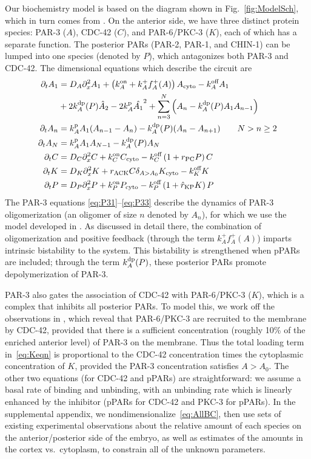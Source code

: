 \documentclass[11pt]{article}
\newcommand{\6}[1]{#1_{\text{6}}}
\newcommand{\3}[1]{#1_{\text{3}}}
\begin{document}
Our biochemistry model is based on the diagram shown in Fig.\ \ref{fig:ModelSch}, which in turn comes from \cite[Fig.~2]{lang2017proteins}. On the anterior side, we have three distinct protein species: PAR-3 ($A$), CDC-42 ($C$), and PAR-6/PKC-3 ($K$), each of which has a separate function. The posterior PARs (PAR-2, PAR-1, and CHIN-1) can be lumped into one species (denoted by $P$), which antagonizes both PAR-3 and CDC-42. The dimensional equations which describe the circuit are 
\begin{subequations}
\label{eq:AllBC}
\begin{align}
\label{eq:P31}
\partial_t A_1 & = D_A \partial_x^2 A_1 + \left(k^\text{on}_A+k^+_A f^+_A(A) \right)A_\text{cyto}- k^\text{off}_A A_1  \\  \nonumber
 &+ 2 k^\text{dp}_A(P) \hat{A}_2-2k^\text{p}_A \hat{A_1}^2+\sum_{n=3}^N \left(A_n-k^\text{dp}_A(P) A_1 A_{n-1}\right)  \\ 
\partial_t A_n & =k^\text{p}_{A}A_1 (A_{n-1}-A_n) -k^\text{dp}_A(P)(A_n-A_{n+1})  \qquad N > n \geq 2 \\ 
\label{eq:P33}
\partial_t A_N & =k^\text{p}_A A_1  A_{N-1}-k^\text{dp}_A(P) A_N \\
\label{eq:Ceqn}
\partial_t C& =D_C \partial_x^2 {C} +k^\text{on}_C C_\text{cyto}  - k^\text{off}_C \left(1+r_\text{PC}P\right)C\\
\label{eq:Keqn}
\partial_t {K}  &= D_K \partial_x^2 {K} + {r}_\text{ACK} {C} \delta_{A > A_0}K_\text{cyto}-k^\text{off}_K K \\
\partial_t {P} & =D_P \partial_x^2 {P} +k^\text{on}_P P_\text{cyto}  - k^\text{off}_P \left(1+\hat{r}_\text{KP}{K}\right){P}
\end{align}
\end{subequations}
The PAR-3 equations \eqref{eq:P31}--\eqref{eq:P33} describe the dynamics of PAR-3 oligomerization  (an oligomer of size $n$ denoted by $A_n$), for which we use the model developed in \cite{lang2023oligomerization}. As discussed in detail there, the combination of oligomerization and positive feedback (through the term $k^+_A f^+_A(A)$) imparts intrinsic bistability to the system. This bistability is strengthened when pPARs are included; through the term $k^\text{dp}_A(P)$, these posterior PARs promote depolymerization of PAR-3.

PAR-3 also gates the association of CDC-42 with PAR-6/PKC-3 ($K$), which is a complex that inhibits all posterior PARs. To model this, we work off the observations in \cite{sailer2015dynamic}, which reveal that PAR-6/PKC-3 are recruited to the membrane by CDC-42, provided that there is a sufficient concentration (roughly 10\% of the enriched anterior level) of PAR-3 on the membrane. Thus the total loading term in\ \eqref{eq:Keqn} is proportional to the CDC-42 concentration times the cytoplasmic concentration of $K$, provided the PAR-3 concentration satisfies $A > A_0$. The other two equations (for CDC-42 and pPARs) are straightforward: we assume a basal rate of binding and unbinding, with an unbinding rate which is linearly enhanced by the inhibitor (pPARs for CDC-42 and PKC-3 for pPARs). In the supplemental appendix, we nondimensionalize\ \eqref{eq:AllBC}, then use sets of existing experimental observations about the relative amount of each species on the anterior/posterior side of the embryo, as well as estimates of the amounts in the cortex vs.\ cytoplasm, to constrain all of the unknown parameters. 
\end{document}
